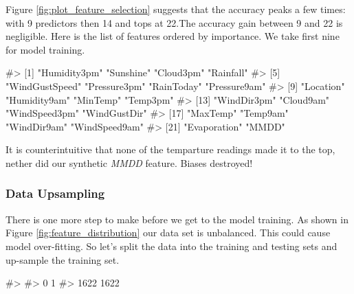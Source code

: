 Figure \ref{fig:plot_feature_selection} suggests that the accuracy peaks
a few times: with 9 predictors then 14 and tops at 22.The accuracy gain
between 9 and 22 is negligible. Here is the list of features ordered by
importance. We take first nine for model training.

\begin{Schunk}
\begin{Soutput}
#>  [1] "Humidity3pm"   "Sunshine"      "Cloud3pm"      "Rainfall"     
#>  [5] "WindGustSpeed" "Pressure3pm"   "RainToday"     "Pressure9am"  
#>  [9] "Location"      "Humidity9am"   "MinTemp"       "Temp3pm"      
#> [13] "WindDir3pm"    "Cloud9am"      "WindSpeed3pm"  "WindGustDir"  
#> [17] "MaxTemp"       "Temp9am"       "WindDir9am"    "WindSpeed9am" 
#> [21] "Evaporation"   "MMDD"
\end{Soutput}
\end{Schunk}

It is counterintuitive that none of the temparture readings made it to
the top, nether did our synthetic \emph{MMDD} feature. Biases destroyed!

\hypertarget{data-upsampling}{%
\subsubsection{Data Upsampling}\label{data-upsampling}}

There is one more step to make before we get to the model training. As
shown in Figure \ref{fig:feature_distribution} our data set is
unbalanced. This could cause model over-fitting. So let's split the data
into the training and testing sets and up-sample the training set.

\begin{Schunk}
\begin{Soutput}
#> 
#>    0    1 
#> 1622 1622
\end{Soutput}
\end{Schunk}


